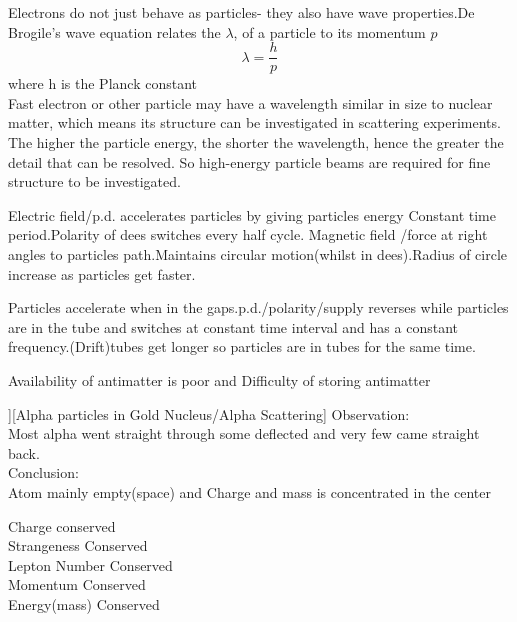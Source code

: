 \documentclass[a4paper]{article}
\begin{document}
\begin{defi}[Electron]
Electrons do not just behave as particles- they also have wave properties.De Brogile's wave equation relates the $\lambda$, of a particle to its momentum $p$
\begin{equation*}
    \lambda=\frac{h}{p}
\end{equation*}
where h is the Planck constant\\

Fast electron or other particle may have a wavelength similar in size to nuclear matter, which means its structure can be investigated in scattering experiments. The higher the particle energy, the shorter the wavelength, hence the greater the detail that can be resolved. So high-energy particle beams are required for fine structure to be investigated.
\end{defi}

\begin{defi}[Cyclotron]
Electric field/p.d. accelerates particles by giving particles energy Constant time period.Polarity of dees switches every half cycle. Magnetic field /force at right angles to particles path.Maintains circular motion(whilst in dees).Radius of circle increase as particles get faster.
\end{defi}
\begin{defi}
Particles accelerate when in the gaps.p.d./polarity/supply reverses while particles are in the tube and switches at constant time interval and has a constant frequency.(Drift)tubes get longer so particles are in tubes for the same time.
\end{defi}




\begin{defi}
Availability of antimatter is poor and Difficulty of storing antimatter
\end{defi}
\begin{defi}][Alpha particles in Gold Nucleus/Alpha Scattering]
Observation:\\
Most alpha went straight through some deflected and very few came straight back.\\
Conclusion:\\
Atom mainly empty(space) and Charge and mass is concentrated in the center
\end{defi}

\begin{defi}
Charge conserved\\
Strangeness Conserved\\
Lepton Number Conserved\\
Momentum Conserved\\
Energy(mass) Conserved
\end{defi}
\end{document}
